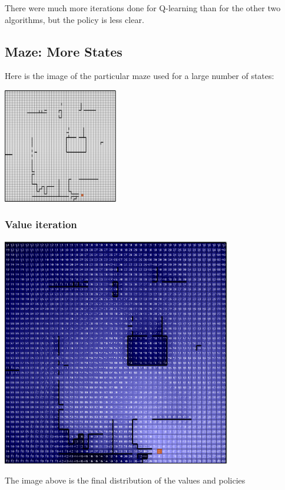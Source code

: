 \documentclass[11pt]{article}
\begin{document}
            There were much more iterations done for Q-learning than
            for the other two algorithms, but the policy is less clear.

        \subsection{Maze: More States}

            Here is the image of the particular maze used for a large
            number of states:

            \includegraphics[width=5cm]{../images/large/maze.PNG}
            

            \subsubsection{Value iteration}

            \includegraphics[width=10cm]{../images/large/vi.PNG}

            The image above is the final
            distribution of the values and policies
\end{document}

